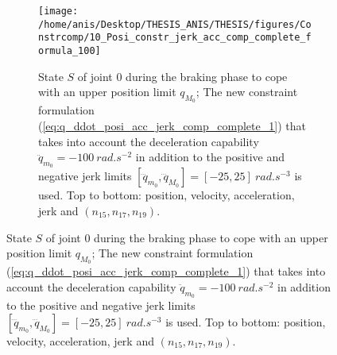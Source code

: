 \begin{figure}[!htbp]
%
%
\begin{figure}[!htbp]
\centering
{\texttt{[image: /home/anis/Desktop/THESIS\_ANIS/THESIS/figures/Constrcomp/10\_Posi\_constr\_jerk\_acc\_comp\_complete\_formula\_100]}}
\caption{State $S$ of joint $0$ during the braking phase to cope with an upper position limit $q_{M_{0}}$; The new constraint formulation (\ref{eq:q_ddot_posi_acc_jerk_comp_complete_1}) that takes into account the deceleration capability $\ddot{q}_{m_{0}}=-100~rad.s^{-2}$ in addition to the positive and negative jerk limits $[\dddot{q}_{m_{0}}, \dddot{q}_{M_{0}}] = [-25, 25]~rad.s^{-3}$ is used. Top to bottom: position, velocity, acceleration, jerk and $(n_{15}, n_{17}, n_{19})$.} 
\label{fig:10_Posi_constr_jerk_acc_comp_complete_formula_100}
\end{figure}

\end{figure}
